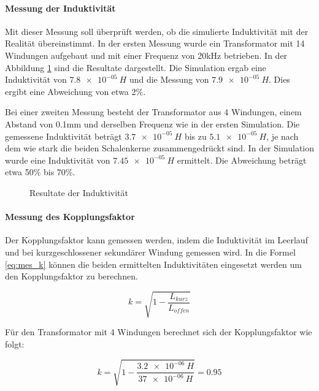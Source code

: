 \paragraph{Messung der Induktivität}
Mit dieser Messung soll überprüft werden, ob die simulierte Induktivität mit der Realität übereinstimmt. In der ersten Messung wurde ein Transformator mit 14 Windungen aufgebaut und mit einer Frequenz von 20kHz betrieben. In der Abbildung \ref{fig:mess_ind} sind die Resultate dargestellt. Die Simulation ergab eine Induktivität von $ \SI{7.8e-05}{H} $ und die Messung von $ \SI{7.9e-05}{H} $. Dies ergibt eine Abweichung von etwa 2\%. 

Bei einer zweiten Messung besteht der Transformator aus 4 Windungen, einem Abstand von 0.1mm und derselben Frequenz wie in der ersten Simulation. Die gemessene Induktivität beträgt $ \SI{3.7e-05}{H} $ bis zu $ \SI{5.1e-05}{H} $, je nach dem wie stark die beiden Schalenkerne zusammengedrückt sind. In der Simulation wurde eine Induktivität von $ \SI{7.45e-05}{H} $ ermittelt. Die Abweichung beträgt etwa 50\% bis 70\%. 

\begin{figure}[H]
	\centering
	\qquad
	\caption{Resultate der Induktivität}
	\label{fig:mess_ind}
\end{figure}

\paragraph{Messung des Kopplungsfaktor}
Der Kopplungsfaktor kann gemessen werden, indem die Induktivität im Leerlauf und bei kurzgeschlossener sekundärer Windung gemessen wird. In die Formel \ref{eq:mes_k} können die beiden ermittelten Induktivitäten eingesetzt werden um den Kopplungsfaktor zu berechnen.

\begin{equation}\label{eq:mes_k}
k = \sqrt{1-\frac{L_{kurz}}{L_{offen}}}
\end{equation}

Für den Transformator mit 4 Windungen berechnet sich der Kopplungsfaktor wie folgt:

\begin{equation}\label{eq:berechnung_k1}
k = \sqrt{1-\frac{\SI{3.2e-06}{H}}{\SI{37e-06}{H}}}=0.95
\end{equation}

